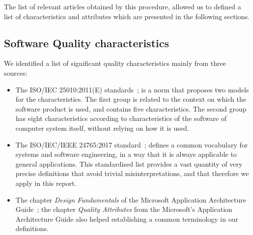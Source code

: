 
The list of relevant articles obtained by this procedure, allowed us to defined a list of characteristics and attributes which are presented in the following sections.

\subsection{Software Quality characteristics}
\label{subsect:sqchar}

We identified a list of significant quality characteristics mainly from three sources:

\begin{itemize}
    \item The ISO/IEC 25010:2011(E) standards~\cite{iso_25010_2011_2017}; is a norm that proposes two models for the characteristics. The first group is related to the context on which the software product is used, and contains five characteristics. The second group has eight characteristics according to characteristics of the software of computer system itself, without relying on how it is used.

    \item The ISO/IEC/IEEE 24765:2017 standard~\cite{iso_iec_24765_2017}; defines a common vocabulary for systems and software engineering, in a way that it is always applicable to general applications. This standardised list provides a vast quantity of very precise definitions that avoid trivial misinterpretations, and that therefore we apply in this report.

    \item The chapter \textit{Design Fundamentals} of the Microsoft Application Architecture Guide~\cite{microsoft_2010}; the chapter \textit{Quality Attributes} from the Microsoft's Application Architecture Guide also helped establishing a common terminology in our definitions.

\end{itemize}

